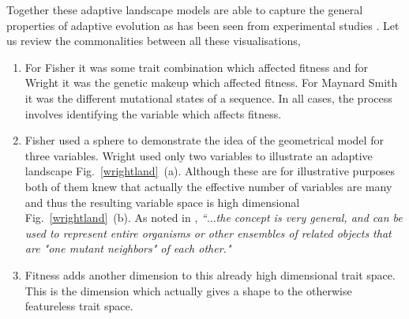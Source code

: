 \documentclass[oneside,11pt,a4paper]{book}
\begin{document}
Together these adaptive landscape models \citep{kauffman:1987aa} are able to capture the general properties of adaptive evolution as has been seen from experimental studies \citep{betancourt:2006ml}.
Let us review the commonalities between all these visualisations,
\begin{enumerate}[\textbf{--}]

\item For Fisher it was some trait combination which affected fitness and for Wright it was the genetic makeup which affected fitness.
For Maynard Smith it was the different mutational states of a sequence.
In all cases, the process involves identifying the variable which affects fitness.

\item Fisher used a sphere to demonstrate the idea of the geometrical model for three variables.
Wright used only two variables to illustrate an adaptive landscape Fig.\ \ref{wrightland}\ (a).
Although these are for illustrative purposes both of them knew that actually the effective number of variables are many and thus the resulting variable space is high dimensional Fig.\ \ref{wrightland}\ (b).
As noted in \citep{kauffman:1989aa}, \textit{``$\ldots$the concept is very general, and can be used to represent entire organisms or other ensembles of related objects that are "one mutant neighbors" of each other."}

\item Fitness adds another dimension to this already high dimensional trait space.
This is the dimension which actually gives a shape to the otherwise featureless trait space.


\end{enumerate}
\end{document}
